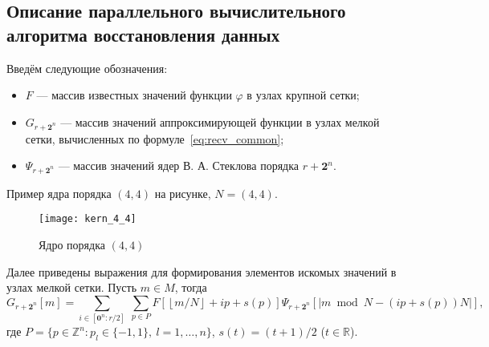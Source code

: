 
\label{sec:func_recv}


\subsection*{Описание параллельного вычислительного алгоритма  восстановления данных}

Введём  следующие обозначения:
\begin{itemize}

\item
  $F$  --- массив  известных значений функции $\varphi$
  в узлах крупной сетки;

\item
  $G_{r+\mathbf{2}^n}$ --- массив
  значений аппроксимирующей функции в узлах мелкой сетки,
  вычисленных по формуле~\eqref{eq:recv_common};

\item
  $\Psi_{r+\mathbf{2}^n}$ --- массив  значений ядер В. А. Стеклова порядка $r+\mathbf{2}^n$.

\end{itemize}




Пример ядра порядка $(4,4)$ на рисунке, $N=(4,4)$.

\begin{figure}[h!]
  \centering
  \texttt{[image: kern\_4\_4]} 
  \caption{Ядро  порядка $(4,4)$}
  \label{fig:kern_4_4}
\end{figure}
\FloatBarrier


 Далее приведены выражения для формирования
 элементов искомых значений в узлах мелкой сетки.
Пусть $m\in M$, тогда
\begin{equation}
  \label{eq:nd}
    G_{r+\mathbf{2}^n}[m] = 
    \sum_{i \in  [\mathbf{0}^n:r/2]}\ \sum_{p\in P} 
        F \left[ \left \lfloor {m}/{N} \right \rfloor + ip + s(p)\right]
      \Psi_{r+\mathbf{2}^n}[|m\bmod N - (ip + s(p))N|],
\end{equation}
где $P=\{p\in\mathbb{Z}^n: p_l\in\{-1,1\},\ l=1,\ldots,n\}$, $s(t)=(t+1)/2$
($t\in\mathbb{R}$).

